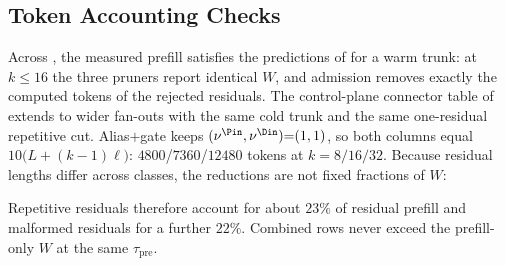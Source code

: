 \subsection{Token Accounting Checks}
\label{sec:ablate-idents}

Across , the measured prefill satisfies the predictions of  for a warm trunk:
at $k\le16$ the three pruners report identical $W$, and admission removes exactly the computed tokens of the rejected residuals.
The control-plane connector table of  extends to wider fan-outs with the same cold trunk and the same one-residual repetitive cut.
Alias$+$gate keeps $(\nu^{\Pin},\nu^{\Din}){=}(1,1)$, so both columns equal $10\bigl(L+(k{-}1)\ell\bigr)$: $4800$/$7360$/$12480$ tokens at $k{=}8/16/32$.
Because residual lengths differ across classes, the reductions are not fixed fractions of $W$:
\begin{center}
\end{center}
Repetitive residuals therefore account for about $23\%$ of residual prefill and malformed residuals for a further $22\%$.
Combined rows never exceed the prefill-only $W$ at the same $\tau_{\mathrm{pre}}$.
